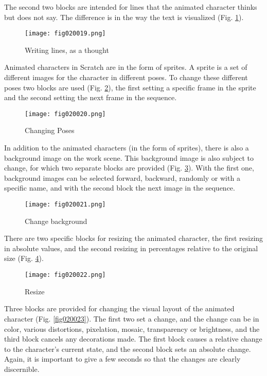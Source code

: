 The second two blocks are intended for lines that the animated character thinks but does not say. The difference is in the way the text is visualized (Fig. \ref{fig020019}).

\begin{figure}[H]
   \centering
   \texttt{[image: fig020019.png]}
   \caption{Writing lines, as a thought}
\label{fig020019}
\end{figure}

Animated characters in Scratch are in the form of sprites. A sprite is a set of different images for the character in different poses. To change these different poses two blocks are used (Fig. \ref{fig020020}), the first setting a specific frame in the sprite and the second setting the next frame in the sequence.

\begin{figure}[H]
   \centering
   \texttt{[image: fig020020.png]}
   \caption{Changing Poses}
\label{fig020020}
\end{figure}

In addition to the animated characters (in the form of sprites), there is also a background image on the work scene. This background image is also subject to change, for which two separate blocks are provided (Fig. \ref{fig020021}). With the first one, background images can be selected forward, backward, randomly or with a specific name, and with the second block the next image in the sequence.

\begin{figure}[H]
   \centering
   \texttt{[image: fig020021.png]}
   \caption{Change background}
\label{fig020021}
\end{figure}

There are two specific blocks for resizing the animated character, the first resizing in absolute values, and the second resizing in percentages relative to the original size (Fig. \ref{fig020022}).

\begin{figure}[H]
   \centering
   \texttt{[image: fig020022.png]}
   \caption{Resize}
\label{fig020022}
\end{figure}

Three blocks are provided for changing the visual layout of the animated character (Fig. \ref{fig020023}). The first two set a change, and the change can be in color, various distortions, pixelation, mosaic, transparency or brightness, and the third block cancels any decorations made. The first block causes a relative change to the character's current state, and the second block sets an absolute change. Again, it is important to give a few seconds so that the changes are clearly discernible.

